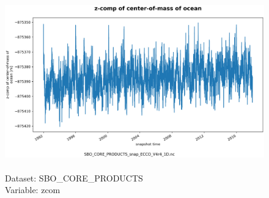 \begin{figure}[H]
\centering
\includegraphics[scale=0.5]{../images/plots/oneD_plots/SBO_Core_Products/zcom.png}
\caption{\\Dataset: SBO\_CORE\_PRODUCTS\\Variable: zcom}
\label{tab:table-SBO_CORE_PRODUCTS_zcom-Plot}
\end{figure}
\pagebreak

